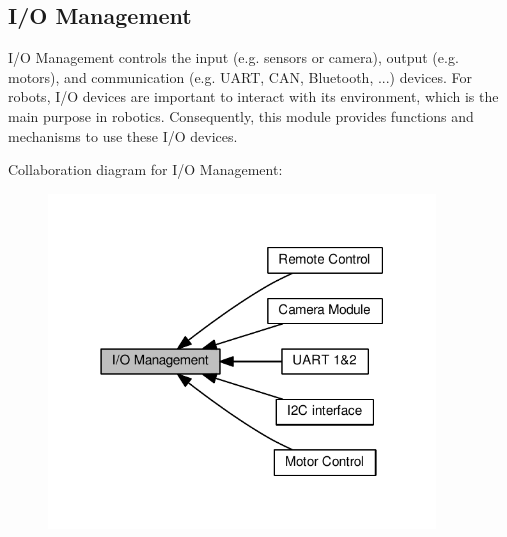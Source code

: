 \hypertarget{group__io}{}\subsection{I/\+O Management}
\label{group__io}


I/\+O Management controls the input (e.\+g. sensors or camera), output (e.\+g. motors), and communication (e.\+g. U\+A\+R\+T, C\+A\+N, Bluetooth, ...) devices. For robots, I/\+O devices are important to interact with its environment, which is the main purpose in robotics. Consequently, this module provides functions and mechanisms to use these I/\+O devices.  


Collaboration diagram for I/\+O Management\+:\nopagebreak
\begin{figure}[H]
\begin{center}
\leavevmode
\includegraphics[width=291pt]{d2/da3/group__io}
\end{center}
\end{figure}
